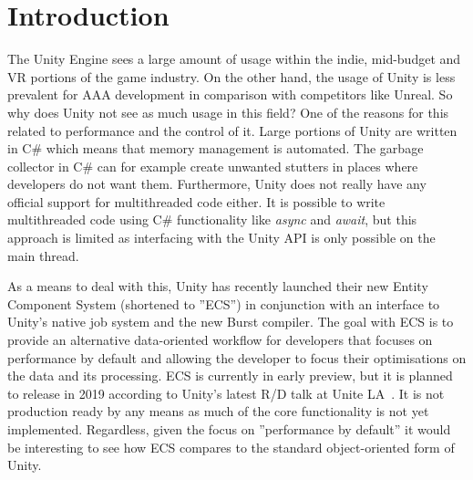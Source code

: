 \chapter{Introduction}
The Unity Engine sees a large amount of usage within the indie, mid-budget and VR portions of the game industry. On the other hand, the usage of Unity is less prevalent for AAA development in comparison with competitors like Unreal. So why does Unity not see as much usage in this field? One of the reasons for this related to performance and the control of it. Large portions of Unity are written in C\# which means that memory management is automated. The garbage collector in C\# can for example create unwanted stutters in places where developers do not want them. Furthermore, Unity does not really have any official support for multithreaded code either. It is possible to write multithreaded code using C\# functionality like \emph{async} and \emph{await}, but this approach is limited as interfacing with the Unity API is only possible on the main thread. 

As a means to deal with this, Unity has recently launched their new Entity Component System (shortened to ''ECS'') in conjunction with an interface to Unity's native job system and the new Burst compiler. The goal with ECS is to provide an alternative data-oriented workflow for developers that focuses on performance by default and allowing the developer to focus their optimisations on the data and its processing. ECS is currently in early preview, but it is planned to release in 2019 according to Unity's latest R/D talk at Unite LA~\cite{unityLARND}. It is not production ready by any means as much of the core functionality is not yet implemented. Regardless, given the focus on ''performance by default'' it would be interesting to see how ECS compares to the standard object-oriented form of Unity. 